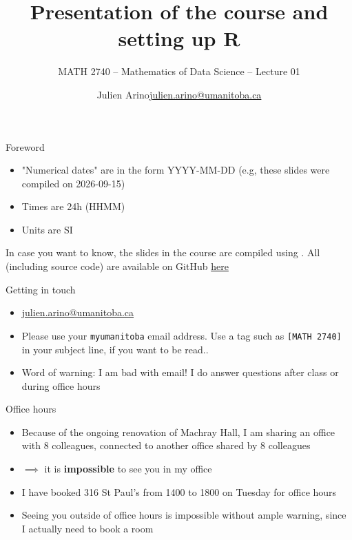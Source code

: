 \documentclass[aspectratio=169]{beamer}\usepackage[]{graphicx}\usepackage[]{xcolor}
\subtitle{MATH 2740 -- Mathematics of Data Science -- Lecture 01}
\author{\texorpdfstring{Julien Arino\newline\url{julien.arino@umanitoba.ca}}{Julien Arino}}
\institute{Department of Mathematics @ University of Manitoba}
\title{Presentation of the course and setting up R}
\begin{document}





\begin{frame}{Foreword}
\begin{itemize}
\item "Numerical dates" are in the form YYYY-MM-DD (e.g, these slides were compiled on 2026-09-15)
\vfill
\item Times are 24h (HHMM)
\vfill
\item Units are SI
\end{itemize}
\vfill
In case you want to know, the slides in the course are  compiled using . All (including source code) are available on GitHub \href{https://github.com/julien-arino/math2740-of-data-science}{here}
\end{frame}

\begin{frame}{Getting in touch}
\begin{itemize}
\item \href{mailto:julien.arino@umanitoba.ca}{julien.arino@umanitoba.ca}
\vfill
\item Please use your \texttt{myumanitoba} email address. Use a tag such as \texttt{[MATH 2740]} in your subject line, if you want to be read..
\vfill
\item Word of warning: I am bad with email! I do answer questions after class or during office hours
\end{itemize}
\end{frame}

\begin{frame}{Office hours}
\begin{itemize}
\item Because of the ongoing renovation of Machray Hall, I am sharing an office with 8 colleagues, connected to another office shared by 8 colleagues
\vfill
\item $\implies$ it is \textbf{impossible} to see you in my office
\vfill
\item I have booked 316 St Paul's from 1400 to 1800 on Tuesday for office hours
\vfill
\item Seeing you outside of office hours is impossible without ample warning, since I actually need to book a room
\end{itemize}
\end{frame}
\end{document}
